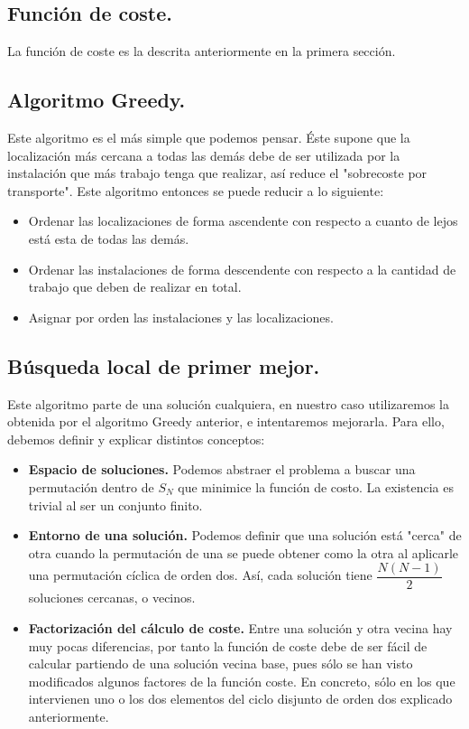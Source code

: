 \subsection{Función de coste.}

La función de coste es la descrita anteriormente en la primera sección.


\subsection{Algoritmo Greedy.}
Este algoritmo es el más simple que podemos pensar. Éste supone que la localización más cercana a todas las demás debe de ser utilizada por la instalación que más trabajo tenga que realizar, así reduce el "sobrecoste por transporte". Este algoritmo entonces se puede reducir a lo siguiente:
\begin{itemize}
	\item Ordenar las localizaciones de forma ascendente con respecto a cuanto de lejos está esta de todas las demás.
	\item Ordenar las instalaciones de forma descendente con respecto a la cantidad de trabajo que deben de realizar en total.
	\item Asignar por orden las instalaciones y las localizaciones.
\end{itemize}

\subsection{Búsqueda local de primer mejor.}

Este algoritmo parte de una solución cualquiera, en nuestro caso utilizaremos la obtenida por el algoritmo Greedy anterior, e intentaremos mejorarla. Para ello, debemos definir y explicar distintos conceptos:

\begin{itemize}
	\item \textbf{Espacio de soluciones.} Podemos abstraer el problema a buscar una permutación dentro de $S_{N}$ que minimice la función de costo. La existencia es trivial al ser un conjunto finito.
	\item \textbf{Entorno de una solución.} Podemos definir que una solución está "cerca" de otra cuando la permutación de una se puede obtener como la otra al aplicarle una permutación cíclica de orden dos. Así, cada solución tiene $\dfrac{N(N-1)}{2}$ soluciones cercanas, o vecinos.
	\item \textbf{Factorización del cálculo de coste.} Entre una solución y otra vecina hay muy pocas diferencias, por tanto la función de coste debe de ser fácil de calcular partiendo de una solución vecina base, pues sólo se han visto modificados algunos factores de la función coste. En concreto, sólo en los que intervienen uno o los dos elementos del ciclo disjunto de orden dos explicado anteriormente.

	
\end{itemize}

